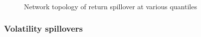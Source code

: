 \documentclass[
  letterpaper,
  DIV=11,
  numbers=noendperiod]{scrartcl}
\begin{document}
\begin{figure}[H]

\begin{minipage}[t]{0.50\linewidth}

{\centering 


}

\end{minipage}%
%
\begin{minipage}[t]{0.50\linewidth}

{\centering 


}

\end{minipage}%
\newline
\begin{minipage}[t]{\linewidth}

{\centering 


}

\end{minipage}%

\caption{\label{fig-rtn}Network topology of return spillover at various
quantiles}

\end{figure}

\hypertarget{volatility-spillovers}{%
\subsubsection{Volatility spillovers}\label{volatility-spillovers}}
\end{document}
